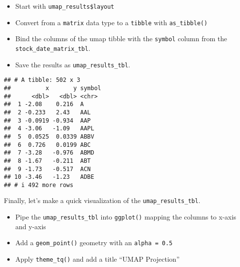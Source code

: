 \documentclass[
]{article}
\newenvironment{Shaded}{\begin{snugshade}}{\end{snugshade}}
\newcommand{\AttributeTok}[1]{\textcolor[rgb]{0.13,0.29,0.53}{#1}}
\newcommand{\CommentTok}[1]{\textcolor[rgb]{0.56,0.35,0.01}{\textit{#1}}}
\newcommand{\FunctionTok}[1]{\textcolor[rgb]{0.13,0.29,0.53}{\textbf{#1}}}
\newcommand{\NormalTok}[1]{#1}
\newcommand{\OtherTok}[1]{\textcolor[rgb]{0.56,0.35,0.01}{#1}}
\newcommand{\SpecialCharTok}[1]{\textcolor[rgb]{0.81,0.36,0.00}{\textbf{#1}}}
\newcommand{\StringTok}[1]{\textcolor[rgb]{0.31,0.60,0.02}{#1}}
\providecommand{\tightlist}{%
  \setlength{\itemsep}{0pt}\setlength{\parskip}{0pt}}
\begin{document}
\begin{itemize}
\tightlist
\item
  Start with \texttt{umap\_results\$layout}
\item
  Convert from a \texttt{matrix} data type to a \texttt{tibble} with
  \texttt{as\_tibble()}
\item
  Bind the columns of the umap tibble with the \texttt{symbol} column
  from the \texttt{stock\_date\_matrix\_tbl}.
\item
  Save the results as \texttt{umap\_results\_tbl}.
\end{itemize}

\begin{Shaded}
\end{Shaded}

\begin{verbatim}
## # A tibble: 502 x 3
##          x       y symbol
##      <dbl>   <dbl> <chr> 
##  1 -2.08    0.216  A     
##  2 -0.233   2.43   AAL   
##  3 -0.0919 -0.934  AAP   
##  4 -3.06   -1.09   AAPL  
##  5  0.0525  0.0339 ABBV  
##  6  0.726   0.0199 ABC   
##  7 -3.28   -0.976  ABMD  
##  8 -1.67   -0.211  ABT   
##  9 -1.73   -0.517  ACN   
## 10 -3.46   -1.23   ADBE  
## # i 492 more rows
\end{verbatim}

Finally, let's make a quick visualization of the
\texttt{umap\_results\_tbl}.

\begin{itemize}
\tightlist
\item
  Pipe the \texttt{umap\_results\_tbl} into \texttt{ggplot()} mapping
  the columns to x-axis and y-axis
\item
  Add a \texttt{geom\_point()} geometry with an \texttt{alpha\ =\ 0.5}
\item
  Apply \texttt{theme\_tq()} and add a title ``UMAP Projection''
\end{itemize}
\end{document}
